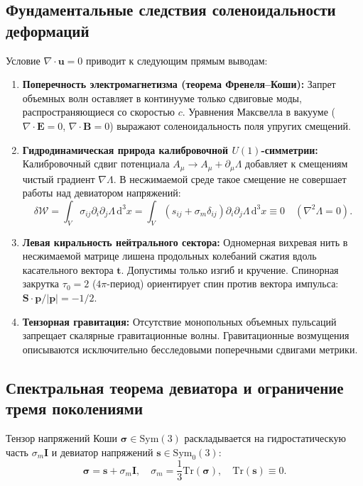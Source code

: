 \documentclass[11pt,a4paper]{article}
\theoremstyle{definition}
\theoremstyle{remark}
\begin{document}
\subsection{Фундаментальные следствия соленоидальности деформаций}
Условие $\nabla \cdot \mathbf{u} = 0$ приводит к следующим прямым выводам:
\begin{enumerate}
    \item \textbf{Поперечность электромагнетизма (теорема Френеля--Коши):} Запрет объемных волн оставляет в континууме только сдвиговые моды, распространяющиеся со скоростью $c$. Уравнения Максвелла в вакууме ($\nabla \cdot \mathbf{E} = 0$, $\nabla \cdot \mathbf{B} = 0$) выражают соленоидальность поля упругих смещений.
    \item \textbf{Гидродинамическая природа калибровочной $U(1)$-симметрии:} Калибровочный сдвиг потенциала $A_\mu \to A_\mu + \partial_\mu \Lambda$ добавляет к смещениям чистый градиент $\nabla \Lambda$. В несжимаемой среде такое смещение не совершает работы над девиатором напряжений:
    \begin{equation}
        \delta \mathcal{W} = \int_V \sigma_{ij} \partial_i \partial_j \Lambda \, \mathrm{d}^3 x = \int_V (s_{ij} + \sigma_m \delta_{ij}) \partial_i \partial_j \Lambda \, \mathrm{d}^3 x \equiv 0 \quad (\nabla^2 \Lambda = 0).
    \end{equation}
    \item \textbf{Левая киральность нейтрального сектора:} Одномерная вихревая нить в несжимаемой матрице лишена продольных колебаний сжатия вдоль касательного вектора $\mathbf{t}$. Допустимы только изгиб и кручение. Спинорная закрутка $\tau_0 = 2$ ($4\pi$-период) ориентирует спин против вектора импульса: $\mathbf{S}\cdot\mathbf{p}/|\mathbf{p}| = -1/2$.
    \item \textbf{Тензорная гравитация:} Отсутствие монопольных объемных пульсаций запрещает скалярные гравитационные волны. Гравитационные возмущения описываются исключительно бесследовыми поперечными сдвигами метрики.
\end{enumerate}

\subsection{Спектральная теорема девиатора и ограничение тремя поколениями}
Тензор напряжений Коши $\boldsymbol{\sigma} \in \mathrm{Sym}(3)$ раскладывается на гидростатическую часть $\sigma_m \mathbf{I}$ и девиатор напряжений $\mathbf{s} \in \mathrm{Sym}_0(3)$:
\begin{equation}
    \boldsymbol{\sigma} = \mathbf{s} + \sigma_m \mathbf{I}, \quad \sigma_m = \frac{1}{3}\mathrm{Tr}(\boldsymbol{\sigma}), \quad \mathrm{Tr}(\mathbf{s}) \equiv 0.
\end{equation}
\end{document}
